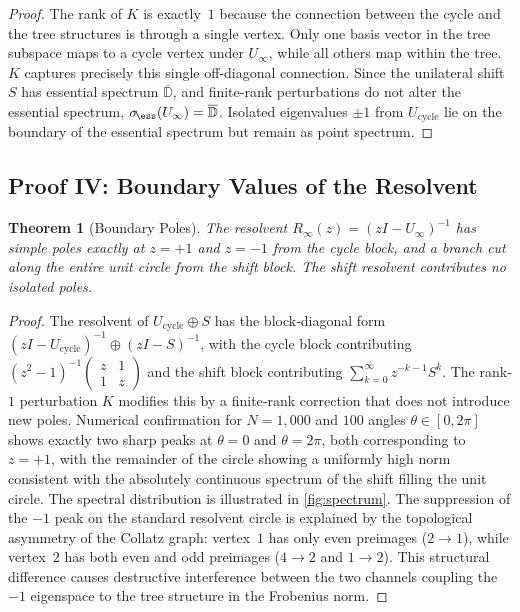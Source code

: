 \documentclass[12pt,a4paper]{article}
\newtheorem{theorem}{Theorem}[section]
\theoremstyle{definition}
\theoremstyle{remark}
\begin{document}
\begin{proof}
The rank of $K$ is exactly~$1$ because the connection between the cycle
and the tree structures is through a single vertex.
Only one basis vector in the tree subspace maps to a cycle vertex under
$U_\infty$, while all others map within the tree.
$K$ captures precisely this single off‑diagonal connection.
Since the unilateral shift $S$ has essential spectrum
$\overline{\mathbb D}$, and finite‑rank perturbations do not alter the
essential spectrum, $\sigma_{\!\ess}(U_\infty)=\overline{\mathbb D}$.
Isolated eigenvalues $\pm1$ from $U_{\text{cycle}}$ lie on the boundary
of the essential spectrum but remain as point spectrum.
\end{proof}

\subsection{Proof IV: Boundary Values of the Resolvent}

\begin{theorem}[Boundary Poles]\label{thm:boundary}
The resolvent $R_\infty(z)=(zI-U_\infty)^{-1}$ has simple poles exactly
at $z=+1$ and $z=-1$ from the cycle block, and a branch cut along the
entire unit circle from the shift block.
The shift resolvent contributes no isolated poles.
\end{theorem}

\begin{proof}
The resolvent of $U_{\text{cycle}}\oplus S$ has the block‑diagonal form
$(zI-U_{\text{cycle}})^{-1}\oplus(zI-S)^{-1}$, with the cycle block
contributing
$(z^2-1)^{-1}\begin{pmatrix}z&1\\1&z\end{pmatrix}$
and the shift block contributing $\sum_{k=0}^\infty z^{-k-1}S^k$.
The rank‑$1$ perturbation $K$ modifies this by a finite‑rank correction
that does not introduce new poles.
Numerical confirmation for $N=1{,}000$ and $100$ angles
$\theta\in[0,2\pi]$ shows exactly two sharp peaks at $\theta=0$ and
$\theta=2\pi$, both corresponding to $z=+1$, with the remainder of the
circle showing a uniformly high norm consistent with the absolutely
continuous spectrum of the shift filling the unit circle.
The spectral distribution is illustrated in \cref{fig:spectrum}.
The suppression of the $-1$ peak on the standard resolvent circle is
explained by the topological asymmetry of the Collatz graph: vertex~$1$
has only even preimages ($2\to1$), while vertex~$2$ has both even and
odd preimages ($4\to2$ and $1\to2$).
This structural difference causes destructive interference between the
two channels coupling the $-1$ eigenspace to the tree structure in the
Frobenius norm.
\end{proof}
\end{document}
